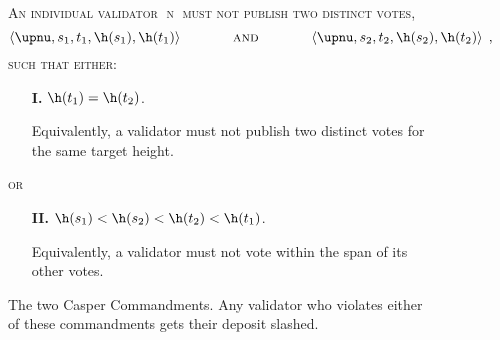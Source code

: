 \documentclass{article}
\begin{document}
\begin{figure}
\begin{mdframed}
\textsc{An individual validator $\upnu$ must not publish two distinct votes,}
\begin{equation*}
\left\langle \upnu, s_1, t_1, \h(s_1), \h(t_1)\right\rangle \hspace{0.5in} \textsc{and} \hspace{0.5in} \left\langle \upnu, s_2, t_2, \h(s_2), \h(t_2)\right\rangle \; ,
\end{equation*}
\textsc{such that either:}

\begin{enumerate}
   \item[\textbf{I.}] $\h(t_1) = \h(t_2)$.

   Equivalently, a validator must not publish two distinct votes for the same target height.
\end{enumerate}
\vspace{-0.15in}
\textsc{or}

\begin{enumerate}
   \item[\textbf{II.}] $\h(s_1) < \h(s_2) < \h(t_2) < \h(t_1)$.

   Equivalently, a validator must not vote within the span of its other votes.
\end{enumerate}
\end{mdframed}
\caption{The two Casper Commandments.  Any validator who violates either of these commandments gets their deposit slashed.}
\label{fig:commandments}
\end{figure}
\cite{caspervlad}
\end{document}
